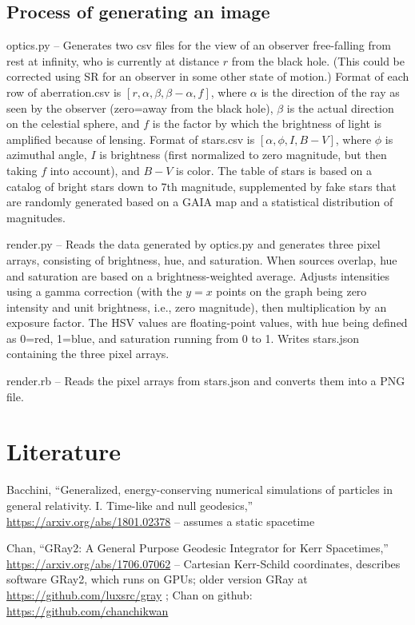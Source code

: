 \documentclass{article}
\begin{document}
\subsection{Process of generating an image}

optics.py -- Generates two csv files for the view of an observer free-falling from rest at infinity,
who is currently at distance $r$ from the black hole.
(This could be corrected using SR for an observer in some other state of motion.) Format of
each row of aberration.csv is $[r,\alpha,\beta,\beta-\alpha,f]$, where $\alpha$ is the direction
of the ray as seen by the observer (zero=away from the black hole), $\beta$ is the actual direction
on the celestial sphere, and $f$ is the factor by which the brightness of light is amplified because
of lensing. Format of stars.csv is $[\alpha,\phi,I,B-V]$, where $\phi$ is azimuthal angle, $I$ is
brightness (first normalized to zero magnitude, but then taking $f$ into account), and $B-V$ is color.
The table of stars is based on a catalog of bright stars down to 7th magnitude, supplemented by
fake stars that are randomly generated based on a GAIA map and a statistical distribution of
magnitudes.

render.py -- Reads the data generated by optics.py and generates three pixel arrays, consisting of
brightness, hue, and saturation. When sources overlap, hue and saturation are based on a brightness-weighted
average. Adjusts intensities using a gamma correction (with the $y=x$ points on the graph being
zero intensity and unit brightness, i.e., zero magnitude), then multiplication by an exposure factor.
The HSV values are floating-point values, with hue being defined as 0=red, 1=blue,
and saturation running from 0 to 1. Writes stars.json containing the three pixel arrays.

render.rb -- Reads the pixel arrays from stars.json and converts them into a PNG file.

\section{Literature}

Bacchini, ``Generalized, energy-conserving numerical simulations of particles
in general relativity. I. Time-like and null geodesics,''
\url{https://arxiv.org/abs/1801.02378} -- assumes a static spacetime

Chan, ``GRay2: A General Purpose Geodesic Integrator for Kerr Spacetimes,''
\url{https://arxiv.org/abs/1706.07062} --
Cartesian Kerr-Schild coordinates, describes software GRay2, which runs on GPUs;
older version GRay at \url{https://github.com/luxsrc/gray} ; Chan on github:
\url{https://github.com/chanchikwan}
\end{document}
